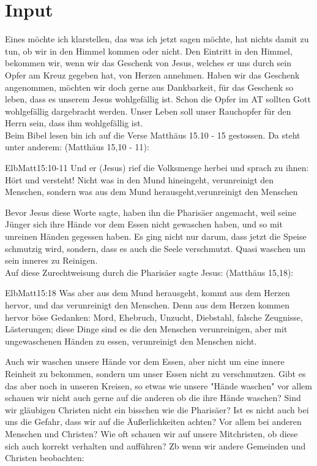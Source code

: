 \documentclass{../inc/mybib}
\begin{document}
\section{ Input }
Eines möchte ich klarstellen, das was ich jetzt sagen möchte, hat nichts damit zu tun, ob wir in den Himmel kommen oder nicht. Den Eintritt in den Himmel, bekommen wir, wenn wir das Geschenk von Jesus, welches er uns durch sein Opfer am Kreuz gegeben hat, von Herzen annehmen. Haben wir das Geschenk angenommen, möchten wir doch gerne aus Dankbarkeit, für das Geschenk so leben, dass es unserem Jesus wohlgefällig ist. Schon die Opfer im AT sollten Gott wohlgefällig dargebracht werden. Unser Leben soll unser Rauchopfer für den Herrn sein, dass ihm wohlgefällig ist.\\
Beim Bibel lesen bin ich auf die Verse Matthäus 15.10 - 15 gestossen. Da steht unter anderem:
(Matthäus 15,10 - 11):
\begin{bibeltext}{Elb}{Matt}{15:10-11}
Und er (Jesus) rief die Volksmenge herbei und sprach zu ihnen: \glqq{}Hört und versteht! Nicht was in den Mund hineingeht, verunreinigt den Menschen, sondern was aus dem Mund herausgeht,verunreinigt den Menschen\grqq
\end{bibeltext}
Bevor Jesus diese Worte sagte, haben ihn die Pharisäer angemacht, weil seine Jünger sich ihre Hände vor dem Essen nicht gewaschen haben, und so mit unreinen Händen gegessen haben. Es ging nicht nur darum, dass jetzt die Speise schmutzig wird, sondern, dass es auch die Seele verschmutzt. Quasi waschen um sein inneres zu Reinigen.\\
Auf diese Zurechtweisung durch die Pharisäer sagte Jesus:
(Matthäus 15,18):
\begin{bibeltext}{Elb}{Matt}{15:18}
\glqq{}Was aber aus dem Mund herausgeht, kommt aus dem Herzen hervor, und das verunreinigt den Menschen. Denn aus dem Herzen kommen hervor böse Gedanken: Mord, Ehebruch, Unzucht, Diebstahl, falsche Zeugnisse, Lästerungen; diese Dinge sind es die den Menschen verunreinigen, aber mit ungewaschenen Händen zu essen, verunreinigt den Menschen nicht.\grqq
\end{bibeltext}
Auch wir waschen unsere Hände vor dem Essen, aber nicht um eine innere Reinheit zu bekommen, sondern um unser Essen nicht zu verschmutzen. Gibt es das aber noch in unseren Kreisen, so etwas wie unsere "Hände waschen" vor allem schauen wir nicht auch gerne auf die anderen ob die ihre Hände waschen? Sind wir gläubigen Christen nicht ein bisschen wie die Pharisäer? Ist es nicht auch bei uns die Gefahr, dass wir auf die Äußerlichkeiten achten? Vor allem bei anderen Menschen und Christen? Wie oft schauen wir auf unsere Mitchristen, ob diese sich auch korrekt verhalten und aufführen? Zb wenn wir andere Gemeinden und Christen beobachten: 
\end{document}
